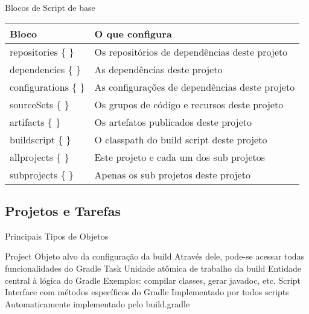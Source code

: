 \documentclass{beamer}
\begin{document}
\begin{frame}{Blocos de Script de base}
 \begin{table}[]
  \begin{tabular}{@{}ll@{}}
    \toprule
    Bloco                   & O que \alert{configura}                            \\ \midrule
    repositories \{ \}      & Os repositórios de dependências deste projeto      \\ \pause
    dependencies \{ \}      & As dependências deste projeto                      \\ \pause
    configurations \{ \}    & As configurações de dependências deste projeto     \\ \pause
    sourceSets \{ \}        & Os grupos de código e recursos deste projeto       \\ \pause
    artifacts \{ \}         & Os artefatos publicados deste projeto              \\ \pause
    buildscript \{ \}       & O classpath do build script deste projeto          \\ \pause
    allprojects \{ \}       & Este projeto e cada um dos sub projetos            \\ \pause
    subprojects \{ \}       & Apenas os sub projetos deste projeto               \\ \bottomrule
  \end{tabular}
\end{table}
\end{frame}

\subsection{Projetos e Tarefas}

\begin{frame}{Principais Tipos de Objetos}
 \begin{outline}
    Project
     Objeto alvo da configuração da build
     Através dele, pode-se acessar todas funcionalidades do Gradle
    Task
     Unidade atômica de trabalho da build
     Entidade central à lógica do Gradle
     Exemplos: compilar classes, gerar javadoc, etc.
    Script
     Interface com métodos específicos do Gradle
     Implementado por todos scripts
     Automaticamente implementado pelo build.gradle
 \end{outline}
\end{frame}
\end{document}
